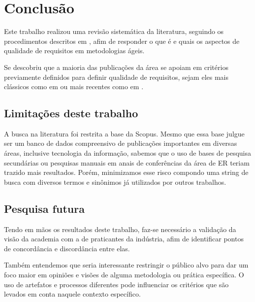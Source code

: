 \section{Conclusão}

Este trabalho realizou uma revisão sistemática da literatura, seguindo os procedimentos descritos em \cite{Kitchenham_2007}, afim de responder o que é e quais os aspectos de qualidade de requisitos em metodologias ágeis.

Se descobriu que a maioria das publicações da área se apoiam em critérios previamente definidos para definir qualidade de requisitos, sejam eles mais clássicos como em \cite{Babok_2015} ou mais recentes como em \cite{SMART_INVEST_2013}.

\subsection{Limitações deste trabalho}

A busca na literatura foi restrita a base da Scopus. Mesmo que essa base julgue ser um banco de dados compreensivo de publicações importantes em diversas áreas, inclusive tecnologia da informação, sabemos que o uso de bases de pesquisa secundárias ou pesquisas manuais em anais de conferências da área de ER teriam trazido mais resultados. Porém, minimizamos esse risco compondo uma string de busca com diversos termos e sinônimos já utilizados por outros trabalhos.

\subsection{Pesquisa futura}

Tendo em mãos os resultados deste trabalho, faz-se necessário a validação da visão da academia com a de praticantes da indústria, afim de identificar pontos de concordância e discordância entre elas.

Também entendemos que seria interessante restringir o público alvo para dar um foco maior em opiniões e visões de alguma metodologia ou prática específica. O uso de artefatos e processos diferentes pode influenciar os critérios que são levados em conta naquele contexto específico.

